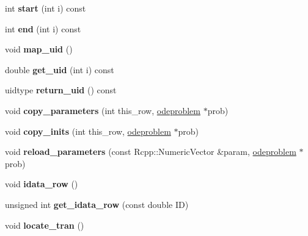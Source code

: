 \begin{DoxyCompactItemize}
int {\bfseries start} (int i) const
\item 
\mbox{\label{classdataobject_acaf7ee8b42108834b3b8c166f8964f64}} 
int {\bfseries end} (int i) const
\item 
\mbox{\label{classdataobject_ac9041a7122585160b536b82da0bed094}} 
void {\bfseries map\+\_\+uid} ()
\item 
\mbox{\label{classdataobject_ac4ca33465e8553b7d0cb1f62ff2c8240}} 
double {\bfseries get\+\_\+uid} (int i) const
\item 
\mbox{\label{classdataobject_a91b02c6fe5f13fc48ad4e030152d5b5d}} 
uidtype {\bfseries return\+\_\+uid} () const
\item 
\mbox{\label{classdataobject_a50ca76ba2c3d3726d61226aa1b73c5b6}} 
void {\bfseries copy\+\_\+parameters} (int this\+\_\+row, \hyperlink{classodeproblem}{odeproblem} $\ast$prob)
\item 
\mbox{\label{classdataobject_a325a1e4bd95b50d07642940ec849c999}} 
void {\bfseries copy\+\_\+inits} (int this\+\_\+row, \hyperlink{classodeproblem}{odeproblem} $\ast$prob)
\item 
\mbox{\label{classdataobject_a675c4b37a93b2680528eb7d862f6ffd5}} 
void {\bfseries reload\+\_\+parameters} (const Rcpp\+::\+Numeric\+Vector \&param, \hyperlink{classodeproblem}{odeproblem} $\ast$prob)
\item 
\mbox{\label{classdataobject_a1c4babcbc61c88f2f72500e594adcce6}} 
void {\bfseries idata\+\_\+row} ()
\item 
\mbox{\label{classdataobject_aa91370d528f90c10c9638ba8006e66fb}} 
unsigned int {\bfseries get\+\_\+idata\+\_\+row} (const double ID)
\item 
\mbox{\label{classdataobject_a3e915eb5ff296483a6ae9dbbe394646b}} 
void {\bfseries locate\+\_\+tran} ()
\item 
\mbox{\label{classdataobject_a75e142ee684513e5aac42241c3aed1e6}} 

\end{DoxyCompactItemize}

